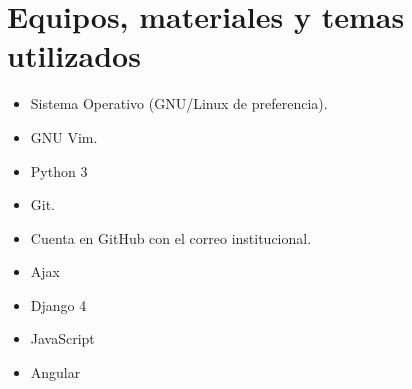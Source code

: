 \section{Equipos, materiales y temas utilizados}
\begin{itemize}
	\item Sistema Operativo (GNU/Linux de preferencia).
	\item GNU Vim.
	\item Python 3
	\item Git.
	\item Cuenta en GitHub con el correo institucional.
        \item Ajax
        \item Django 4
        \item JavaScript
        \item Angular
\end{itemize}